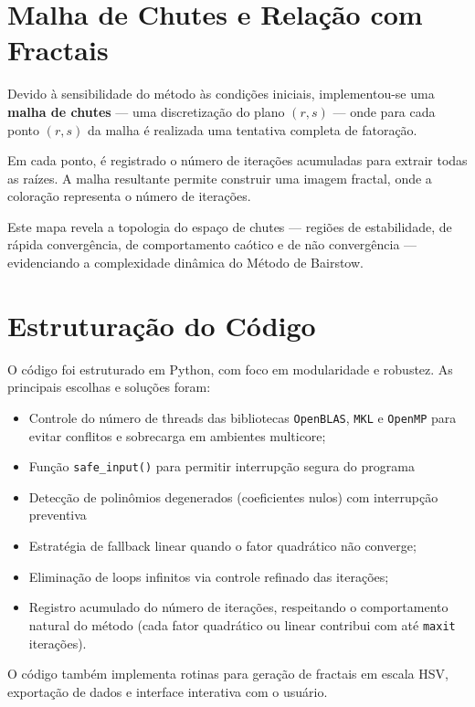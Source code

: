 \documentclass[12pt]{article}
\begin{document}
\section{Malha de Chutes e Relação com Fractais}

Devido à sensibilidade do método às condições iniciais, implementou-se uma \textbf{malha de chutes} — uma discretização do plano $(r, s)$ — onde para cada ponto $(r, s)$ da malha é realizada uma tentativa completa de fatoração.

Em cada ponto, é registrado o número de iterações acumuladas para extrair todas as raízes. A malha resultante permite construir uma imagem fractal, onde a coloração representa o número de iterações.

Este mapa revela a topologia do espaço de chutes — regiões de estabilidade, de rápida convergência, de comportamento caótico e de não convergência — evidenciando a complexidade dinâmica do Método de Bairstow.

\section{Estruturação do Código}

O código foi estruturado em Python, com foco em modularidade e robustez. As principais escolhas e soluções foram:

\begin{itemize}
\item Controle do número de threads das bibliotecas \texttt{OpenBLAS}, \texttt{MKL} e \texttt{OpenMP} para evitar conflitos e sobrecarga em ambientes multicore;
\item Função \texttt{safe\_input()} para permitir interrupção segura do programa
\item Detecção de polinômios degenerados (coeficientes nulos) com interrupção preventiva
\item Estratégia de fallback linear quando o fator quadrático não converge;
\item Eliminação de loops infinitos via controle refinado das iterações;
\item Registro acumulado do número de iterações, respeitando o comportamento natural do método (cada fator quadrático ou linear contribui com até \texttt{maxit} iterações).
\end{itemize}

O código também implementa rotinas para geração de fractais em escala HSV, exportação de dados e interface interativa com o usuário.
\end{document}
